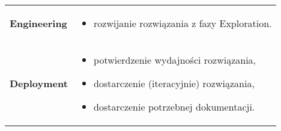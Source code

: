 \documentclass[a4paper]{article}
\begin{document}
\begin{table}[H]
\begin{center}
\begin{tabular}{ p{} p{} }
                \textbf{Engineering}
                &
                \begin{itemize}
                    \item rozwijanie rozwiązania z fazy Exploration.
                \end{itemize}
                \\

                \textbf{Deployment}
                &
                \begin{itemize}
                    \item potwierdzenie wydajności rozwiązania,
                    \item dostarczenie (iteracyjnie) rozwiązania,
                    \item dostarczenie potrzebnej dokumentacji.
                \end{itemize}
                \\
            \end{tabular}
        \end{center}
    \end{table}
\end{document}
